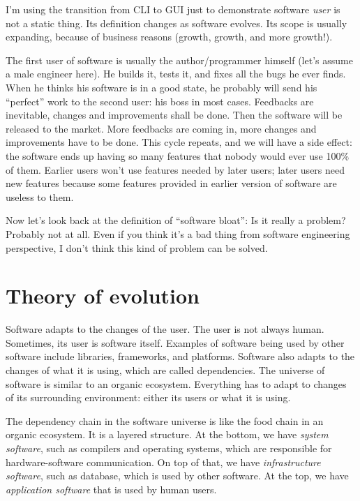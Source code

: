 \documentclass[a4paper, 11pt]{article}
\begin{document}
I'm using the transition from CLI to GUI just to demonstrate software
\emph{user} is not a static thing. Its definition changes as software
evolves. Its scope is usually expanding, because of business reasons
(growth, growth, and more growth!).

The first user of software is usually the author/programmer himself
(let's assume a male engineer here). He builds it, tests it, and fixes
all the bugs he ever finds. When he thinks his software is in a good
state, he probably will send his ``perfect'' work to the second user:
his boss in most cases. Feedbacks are inevitable, changes and
improvements shall be done. Then the software will be released to the
market. More feedbacks are coming in, more changes and improvements
have to be done. This cycle repeats, and we will have a side effect:
the software ends up having so many features that nobody would ever
use 100\% of them. Earlier users won't use features needed by later
users; later users need new features because some features provided in
earlier version of software are useless to them.

Now let's look back at the definition of ``software bloat'': Is it
really a problem? Probably not at all. Even if you think it's a bad
thing from software engineering perspective, I don't think this kind
of problem can be solved.

\section*{Theory of evolution}

Software adapts to the changes of the user. The user is not always
human. Sometimes, its user is software itself. Examples of software
being used by other software include libraries, frameworks, and
platforms. Software also adapts to the changes of what it is using,
which are called dependencies. The universe of software is similar to
an organic ecosystem. Everything has to adapt to changes of its
surrounding environment: either its users or what it is using.

The dependency chain in the software universe is like the food chain
in an organic ecosystem. It is a layered structure. At the bottom, we
have \emph{system software}, such as compilers and operating systems,
which are responsible for hardware-software communication. On top of
that, we have \emph{infrastructure software}, such as database, which
is used by other software. At the top, we have \emph{application
  software} that is used by human users.
\end{document}
